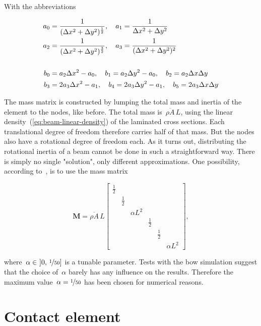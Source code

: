 With the abbreviations

\begin{align}
a_{0} &= \frac{1}{(\Delta x^2 + \Delta y^2)^{\frac{1}{2}}},\quad
a_{1}  = \frac{1}{\Delta x^2 + \Delta y^2}\notag\\
a_{2} &= \frac{1}{(\Delta x^2 + \Delta y^2)^{\frac{3}{2}}},\quad
a_{3}  = \frac{1}{(\Delta x^2 + \Delta y^2)^{2}}\\
\notag\\
b_{0} &= a_{2}\Delta x^2 - a_{0},\quad b_{1} = a_{2}\Delta y^2 - a_{0},\quad b_{2} = a_{2}\Delta x\Delta y\notag\\
b_{3} &= 2a_{3}\Delta x^2 - a_{1},\quad b_{4} = 2a_{3}\Delta y^2 - a_{1},\quad b_{5} = 2a_{3}\Delta x\Delta y
\end{align}

The mass matrix is constructed by lumping the total mass and inertia of the element to the nodes, like before.
The total mass is~$\overline{\rho A}\,L$, using the linear density~(\ref{eq:beam-linear-density}) of the laminated cross sections.
Each translational degree of freedom therefore carries half of that mass. But the nodes also have a rotational degree of freedom each.
As it turns out, distributing the rotational inertia of a beam cannot be done in such a straightforward way.
There is simply no single "solution", only different approximations.
One possibility, according to~\cite{bib:beam_element_2}, is to use the mass matrix

\begin{equation}
\boldsymbol{M} = 
\overline{\rho A}\,L
\begin{bmatrix}
\frac{1}{2}\\
& \frac{1}{2}\\
&& \alpha L^2\\
&&& \frac{1}{2}\\
&&&& \frac{1}{2}\\
&&&&& \alpha L^2
\end{bmatrix},
\end{equation}

where~$\alpha \in\ ]0,\,\nicefrac{1}{50}]$ is a tunable parameter. Tests with the bow simulation suggest that the choice of~$\alpha$ barely has any influence on the results. Therefore the maximum value~$\alpha = \nicefrac{1}{50}$ has been chosen for numerical reasons.

\newpage
\section{Contact element}

